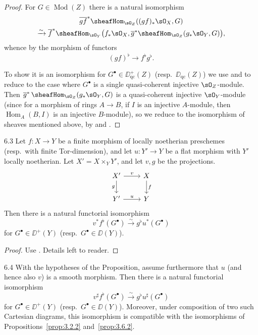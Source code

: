 \begin{proof}
For $G\in\operatorname{Mod}(Z)$ there is a natural isomorphism
\begin{multline*}
\overline{gf}^{*}\sheafHom_{\sO_Z}((gf)_*\sO_X,G) \\
\xrightarrow{\sim} \overline{f}^{*}\sheafHom_{\sO_Y}\bigl(f_*\sO_X,
\overline{g}^{*}\sheafHom_{\sO_Z}(g_*\sO_Y,G)\bigr),
\end{multline*}
whence by  the morphism of functors
\[
(gf)^{\flat} \longrightarrow f^{\flat}g^{\flat}.
\]

To show it is an isomorphism for $G^\bullet\in\DD_{\mathrm{qc}}^+(Z)$ (resp.\ $\DD_{\mathrm{qc}}(Z)$) we use  and  to reduce to the case where $G^\bullet$ is a single quasi-coherent injective $\sO_Z$-module. Then $\overline{g}^*\,\sheafHom_{\sO_Z}(g_*\sO_Y,G)$ is a quasi-coherent injective $\sO_Y$-module (since for a morphism of rings $A\to B$, if $I$ is an injective $A$-module, then $\operatorname{Hom}_A(B,I)$ is an injective $B$-module), so we reduce to the isomorphism of sheaves mentioned above, by  and .
\end{proof}

\begin{bookproposition}{6.3}\label{prop:3.6.3}
Let $f\colon X\to Y$ be a finite morphism of locally noetherian preschemes (resp.\ with finite Tor-dimension), and let $u\colon Y'\to Y$ be a flat morphism with $Y'$ locally noetherian. Let $X'=X\times_Y Y'$, and let $v,g$ be the projections.
\[
\begin{tikzcd}
	X' \arrow[r, "v"] \arrow[d, "g"'] & X \arrow[d, "f"] \\
	Y' \arrow[r, "u"] & Y
\end{tikzcd}
\]
Then there is a natural functorial isomorphism
\[
v^*f^{\flat}(G^\bullet) \xrightarrow{\sim} g^{\flat}u^*(G^\bullet)
\]
for $G^\bullet\in\DD^+(Y)$ (resp.\ $G^\bullet\in\DD(Y)$).
\end{bookproposition}

\begin{proof}
Use . Details left to reader.
\end{proof}

\begin{bookcorollary}{6.4}\label{cor:3.6.4}
With the hypotheses of the Proposition, assume furthermore that $u$ (and hence also $v$) is a smooth morphism. Then there is a natural functorial isomorphism
\[
v^{\sharp}f^{\flat}(G^\bullet) \xrightarrow{\sim} g^{\flat}u^{\sharp}(G^\bullet)
\]
for $G^\bullet\in\DD^+(Y)$ (resp.\ $G^\bullet\in\DD(Y)$). Moreover, under composition of two such Cartesian diagrams, this isomorphism is compatible with the isomorphisms of Propositions~\ref{prop:3.2.2} and~\ref{prop:3.6.2}.
\end{bookcorollary}


